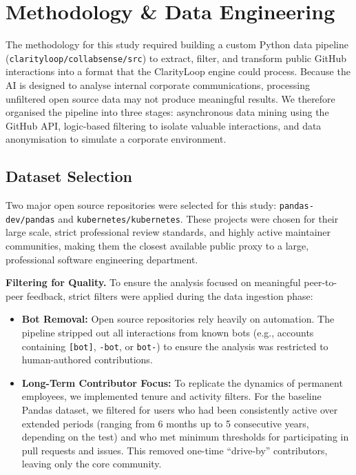 \documentclass[a4paper,UKenglish,cleveref,autoref]{lipics-v2021}
\begin{document}
\section{Methodology \& Data Engineering}
The methodology for this study required building a custom Python data pipeline (\texttt{clarityloop/\allowbreak collabsense/\allowbreak src}) to extract, filter, and transform public GitHub interactions into a format that the ClarityLoop engine could process. Because the AI is designed to analyse internal corporate communications, processing unfiltered open source data may not produce meaningful results. We therefore organised the pipeline into three stages: asynchronous data mining using the GitHub API, logic-based filtering to isolate valuable interactions, and data anonymisation to simulate a corporate environment.

\subsection{Dataset Selection}
Two major open source repositories were selected for this study: \texttt{pandas-dev/pandas} and \texttt{kubernetes/kubernetes}. These projects were chosen for their large scale, strict professional review standards, and highly active maintainer communities, making them the closest available public proxy to a large, professional software engineering department.

\textbf{Filtering for Quality.}
To ensure the analysis focused on meaningful peer-to-peer feedback, strict filters were applied during the data ingestion phase:
\begin{itemize}
	\item \textbf{Bot Removal:} Open source repositories rely heavily on automation. The pipeline stripped out all interactions from known bots (e.g., accounts containing \texttt{[bot]}, \texttt{-bot}, or \texttt{bot-}) to ensure the analysis was restricted to human-authored contributions.
	\item \textbf{Long-Term Contributor Focus:} To replicate the dynamics of permanent employees, we implemented tenure and activity filters. For the baseline Pandas dataset, we filtered for users who had been consistently active over extended periods (ranging from 6 months up to 5 consecutive years, depending on the test) and who met minimum thresholds for participating in pull requests and issues. This removed one-time ``drive-by'' contributors, leaving only the core community.
\end{itemize}
\end{document}
